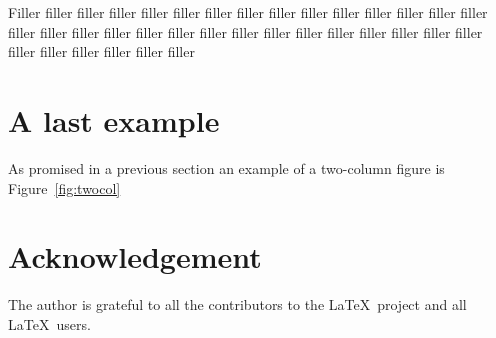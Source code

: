 \documentclass{fonetik}
\begin{document}
Filler filler filler filler filler filler filler filler filler
filler filler filler filler filler filler filler filler filler
filler filler filler filler filler filler filler filler filler
filler filler filler filler filler filler filler filler filler

\section{A last example}
As promised in a previous section an example of a
two-column figure is Figure~\ref{fig:twocol}

\section{Acknowledgement}
The author is grateful to all the contributors to the \LaTeX\ project
and all \LaTeX\ users.




\end{document}
